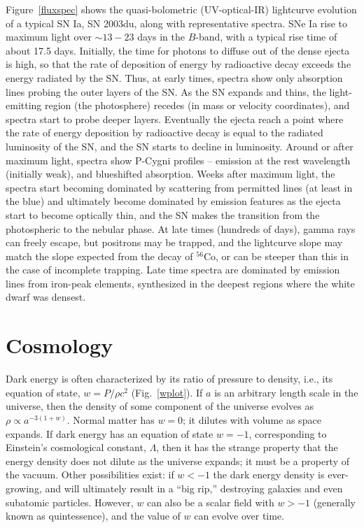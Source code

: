 \documentclass{nature1}
\begin{document}
Figure~\ref{fluxspec} shows the quasi-bolometric (UV-optical-IR)
lightcurve evolution of a typical SN Ia, SN
2003du\citep{2007A&A...469..645S}, along with representative spectra.
SNe Ia rise to maximum light over $\sim 13-23$ days in the $B$-band,
with a typical rise time of about 17.5
days\citep{2010ApJ...712..350H}.  Initially, the time for photons to
diffuse out of the dense ejecta is high, so that the rate of
deposition of energy by radioactive decay exceeds the energy radiated
by the SN.  Thus, at early times, spectra show only absorption lines
probing the outer layers of the SN.  As the SN expands and thins, the
light-emitting region (the photosphere) recedes (in mass or velocity
coordinates), and spectra start to probe deeper layers.  Eventually
the ejecta reach a point where the rate of energy deposition by
radioactive decay is equal to the radiated luminosity of the SN, and
the SN starts to decline in luminosity\citep{1982ApJ...253..785A}.
Around or after maximum light, spectra show P-Cygni profiles --
emission at the rest wavelength (initially weak), and blueshifted
absorption.  Weeks after maximum light, the spectra start becoming
dominated by scattering from permitted lines (at least in the
blue)\citep{2008PASP..120..135B} and ultimately become dominated by
emission features as the ejecta start to become optically thin, and
the SN makes the transition from the photospheric to the nebular
phase.  At late times (hundreds of days), gamma rays can freely
escape, but positrons may be trapped\citep{2006AJ....132.2024L}, and
the lightcurve slope may match the slope expected from the decay of
$^{56}$Co, or can be steeper than this in the case of incomplete
trapping.  Late time spectra are dominated by emission lines from
iron-peak elements, synthesized in the deepest regions where the white
dwarf was densest.

\section{Cosmology}
Dark energy is often characterized by its ratio of pressure to
density, i.e., its equation of state, $w=P/\rho c^2$
(Fig.~\ref{wplot}).  If $a$ is an arbitrary length scale in the
universe, then the density of some component of the universe evolves
as $\rho \propto a^{-3(1+w)}.$ Normal matter has $w=0$; it dilutes
with volume as space expands.  If dark energy has an equation of state
$w=-1$, corresponding to Einstein's cosmological constant, $\Lambda$,
then it has the strange property that the energy density does not
dilute as the universe expands; it must be a property of the vacuum.
Other possibilities exist: if $w<-1$ the dark energy density is
ever-growing, and will ultimately result in a ``big rip,'' destroying
galaxies and even subatomic particles.  However, $w$ can also be a
scalar field with $w>-1$ (generally known as quintessence), and the
value of $w$ can evolve over time.
\end{document}
